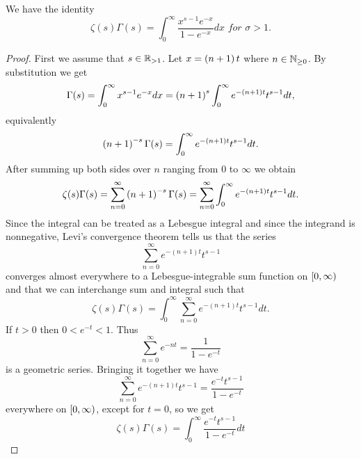 \begin{theorem}
	We have the identity
\begin{equation}
	\zeta(s)\Gamma(s) = \int _0 ^\infty \frac{x^{s - 1} e^{-x}}{1 - e^{-x}} dx \textit{ for } \sigma > 1.
\end{equation}
\end{theorem}
\begin{proof}
	First we assume that $s \in \mathbb{R}_{> 1}$. Let $x = \left(n + 1\right) t$ where $n \in \mathbb{N}_{\geq 0}$. By substitution we get
\begin{equation*}
	\Gamma(s) = \int _0 ^{\infty} x^{s - 1} e^{-x} dx = \left(n + 1\right)^s \int _0 ^\infty e^{-\left(n + 1\right) t} t^{s - 1} dt,
\end{equation*}
equivalently
\begin{equation*}
	\left(n + 1\right)^{-s} \Gamma(s) = \int _0 ^\infty e^{-\left(n + 1\right) t} t^{s - 1} dt.
\end{equation*}
	After summing up both sides over $n$ ranging from $0$ to $\infty$ we obtain
\begin{equation*}
	\zeta(s) \Gamma(s) = \sum _{n = 0} ^\infty \left(n + 1\right)^{-s} \Gamma(s) = \sum _{n = 0} ^\infty \int _0 ^\infty e^{-(n + 1) t} t^{s - 1} dt.
\end{equation*}
	Since the integral can be treated as a Lebesgue integral and since the integrand is nonnegative, Levi’s convergence theorem tells us that the series
\begin{equation*}
	\sum _{n=0} ^\infty e^{-(n + 1) t} t^{s - 1}
\end{equation*}
	converges almost everywhere to a Lebesgue-integrable sum function on $\left[0, \infty\right)$ and that we can interchange sum and integral such that
\begin{equation*}
	\zeta(s) \Gamma(s) = \int _0 ^\infty \sum _{n = 0} ^\infty e^{-(n + 1) t} t^{s - 1} dt.
\end{equation*}
	If $t > 0$ then $0 < e^{-t} < 1$. Thus
\begin{equation*}
	\sum _{n = 0} ^\infty e^{-n t} = \frac{1}{1 - e^{-t}}
\end{equation*}
	is a geometric series. Bringing it together we have
\begin{equation*}
	\sum _{n=0} ^\infty e^{-(n + 1) t} t^{s - 1} = \frac{e^{-t} t^{s - 1}}{1 - e^{-t}}
\end{equation*}
	everywhere on $\left[0, \infty\right)$, except for $t = 0$, so we get
\begin{equation*}
	\zeta(s) \Gamma(s) = \int _0 ^\infty \frac{e^{-t} t^{s - 1}}{1 - e^{-t}} dt

\end{equation*}
\end{proof}
